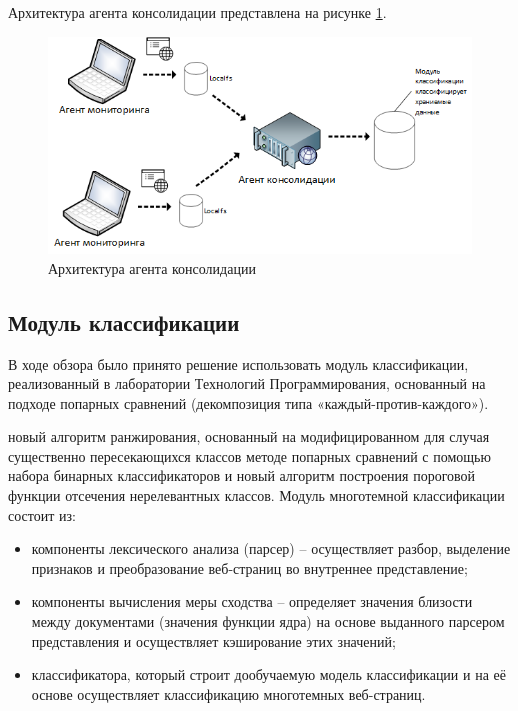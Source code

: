\documentclass[russian, utf8, emptystyle]{eskdtext}
\begin{document}
Архитектура агента консолидации представлена на рисунке \ref{fig:arch_gather}.
\begin{figure}[h]
	\begin{center}
		\includegraphics[width=14cm]{pic/agent2.png}
		\caption{Архитектура агента консолидации}
		\label{fig:arch_gather}
	\end{center}
\end{figure}
\subsection{Модуль классификации}
В ходе обзора было принято решение использовать модуль классификации, реализованный в лаборатории Технологий Программирования, основанный на подходе попарных сравнений (декомпозиция типа «каждый-против-каждого»). 

новый алгоритм ранжирования, основанный на модифицированном для случая существенно пересекающихся классов методе попарных сравнений с помощью набора бинарных классификаторов и новый алгоритм построения пороговой функции отсечения нерелевантных классов. 
Модуль многотемной классификации состоит из:
\begin{itemize}
	\item компоненты лексического анализа (парсер) – осуществляет разбор, выделение признаков и преобразование веб-страниц во внутреннее представление;
	\item компоненты вычисления меры сходства – определяет значения близости между документами (значения функции ядра) на основе выданного парсером представления и осуществляет кэширование этих значений; 
	\item классификатора, который строит дообучаемую модель классификации и на её основе осуществляет классификацию многотемных веб-страниц.
\end{itemize}
\end{document}
